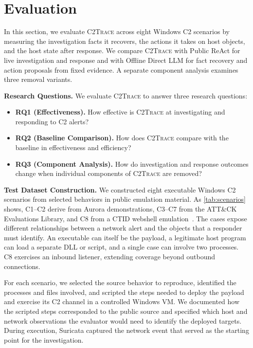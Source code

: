 \documentclass[pdflatex,sn-basic]{sn-jnl}
\newcommand{\system}{\textsc{C2Trace}\xspace}
\begin{document}
\section{Evaluation}
\label{sec:evaluation}

In this section, we evaluate \system across eight Windows C2 scenarios by measuring the investigation facts it recovers, the actions it takes on host objects, and the host state after response. We compare \system with Public ReAct for live investigation and response and with Offline Direct LLM for fact recovery and action proposals from fixed evidence. A separate component analysis examines three removal variants.

\noindent\textbf{Research Questions.}
We evaluate \system to answer three research questions:
\begin{itemize}[leftmargin=*, itemsep=3pt, topsep=3pt]
  \item \textbf{RQ1 (Effectiveness).} How effective is \system at investigating and responding to C2 alerts?
  \item \textbf{RQ2 (Baseline Comparison).} How does \system compare with the baseline in effectiveness and efficiency?
  \item \textbf{RQ3 (Component Analysis).} How do investigation and response outcomes change when individual components of \system are removed?
\end{itemize}

\noindent\textbf{Test Dataset Construction.} We constructed eight executable Windows C2 scenarios from selected behaviors in public emulation material. As \autoref{tab:scenarios} shows, C1--C2 derive from Aurora demonstrations, C3--C7 from the ATT\&CK Evaluations Library, and C8 from a CTID webshell emulation~\citep{aurora2026,attackevals-ael-repo,ctid-ael-repo}. The cases expose different relationships between a network alert and the objects that a responder must identify. An executable can itself be the payload, a legitimate host program can load a separate DLL or script, and a single case can involve two processes. C8 exercises an inbound listener, extending coverage beyond outbound connections.

For each scenario, we selected the source behavior to reproduce, identified the processes and files involved, and scripted the steps needed to deploy the payload and exercise its C2 channel in a controlled Windows VM. We documented how the scripted steps corresponded to the public source and specified which host and network observations the evaluator would need to identify the deployed targets. During execution, Suricata captured the network event that served as the starting point for the investigation. 
\end{document}
